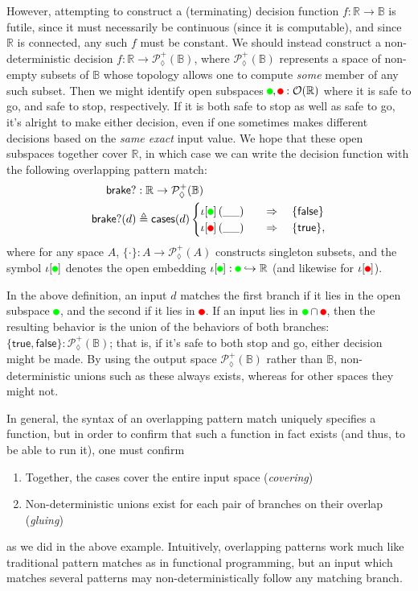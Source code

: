\documentclass[conference]{IEEEtran}
\newcommand{\PLower}{\mathcal{P}_\lozenge}
\newcommand{\hookto}{\hookrightarrow}
\newcommand{\R}{\mathbb{R}}
\newcommand{\bool}{\mathbb{B}}
\newcommand{\wildcard}{\_\_}
\newcommand*{\tikzbullet}[2]{%
{
  \setbox0=\hbox{\strut}%
  \begin{tikzpicture}
    \useasboundingbox (-.25em,0) rectangle (.25em,\ht0);
    \filldraw[draw=#1,fill=#2] (0,0.3\ht0) circle[radius=.25em];
  \end{tikzpicture}%
  }
}
\newcommand{\GoSafe}{\tikzbullet{green}{green}}
\newcommand{\StopSafe}{\tikzbullet{red}{red}}
\newcommand{\oinclf}[1]{\iota[{#1}]}
\newcommand{\oincl}[2]{\oinclf{#1} \left({#2}\right)}
\newcommand{\Branch}{\Rightarrow}
\begin{document}
However, attempting to construct a (terminating) decision function $f : \R \to \bool$ is futile, since it must necessarily be continuous (since it is computable), and since $\R$ is connected, any such $f$ must be constant. We should instead construct a non-deterministic decision $f : \R \to \PLower^+(\bool)$, where $\PLower^+(\bool)$ represents a space of non-empty subsets of $\bool$ whose topology allows one to compute \emph{some} member of any such subset. Then we might identify open subspaces $\GoSafe, \StopSafe : \mathcal{O}(\R)$ where it is safe to go, and safe to stop, respectively. If it is both safe to stop as well as safe to go, it's alright to make either decision, even if one sometimes makes different decisions based on the \emph{same exact} input value. We hope that these open subspaces together cover $\R$, in which case we can write the decision function with the following overlapping pattern match:
\begin{align*}
\mathsf{brake?} &: \R \to \PLower^+(\bool)
\\ \mathsf{brake?}(d) &\triangleq \mathsf{cases}(d)
\begin{cases}
\oincl{\GoSafe}{\wildcard}
  \quad &\Branch \quad
  \{ \mathsf{false} \}
\\
\oincl{\StopSafe}{\wildcard}
  \quad &\Branch \quad
  \{ \mathsf{true} \},
\end{cases}
\end{align*}
where for any space $A$, $\{ \cdot \} : A \to \PLower^+(A)$ constructs singleton subsets, and the symbol $\oinclf{\GoSafe}$ denotes the open embedding $\oinclf{\GoSafe} : \GoSafe \hookto \R$ (and likewise for $\oinclf{\StopSafe}$).

In the above definition, an input $d$ matches the first branch if it lies in the open subspace $\GoSafe$, and the second if it lies in $\StopSafe$. If an input lies in $\GoSafe \cap \StopSafe$, then the resulting behavior is the union of the behaviors of both branches: $\{ \mathsf{true}, \mathsf{false} \} : \PLower^+(\bool)$; that is, if it's safe to both stop and go, either decision might be made. By using the output space $\PLower^+(\bool)$ rather than $\bool$, non-deterministic unions such as these always exists, whereas for other spaces they might not.

In general, the syntax of an overlapping pattern match uniquely specifies a function, but in order to confirm that such a function in fact exists (and thus, to be able to run it), one must confirm
\begin{enumerate}
\item Together, the cases cover the entire input space (\emph{covering})
\item Non-deterministic unions exist for each pair of branches on their overlap (\emph{gluing})
\end{enumerate}
as we did in the above example. Intuitively, overlapping patterns work much like traditional pattern matches as in functional programming, but an input which matches several patterns may non-deterministically follow any matching branch.
\end{document}

